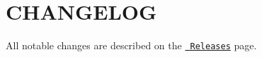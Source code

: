 \chapter{CHANGELOG}
\hypertarget{md_node__modules_2babel-plugin-transform-react-remove-prop-types_2CHANGELOG}{}\label{md_node__modules_2babel-plugin-transform-react-remove-prop-types_2CHANGELOG}
All notable changes are described on the \href{https://github.com/oliviertassinari/babel-plugin-transform-react-remove-prop-types/releases}{\texttt{ Releases}} page. 